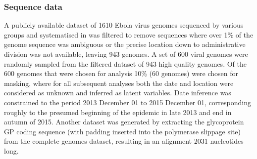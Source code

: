 \documentclass[11pt,oneside,letterpaper]{article}
\begin{document}
\subsubsection*{Sequence data}
A publicly available dataset of 1610 Ebola virus genomes sequenced by various groups \citep{baize_emergence_2014,gire_genomic_2014,park_ebola_2015,carroll_temporal_2015,kugelman_monitoring_2015,ladner_evolution_2015,simon-loriere_distinct_2015,tong_genetic_2015,arias_rapid_2016,smits_genotypic_2015,quick_rapid_2015} and systematised in \cite{dudas_virus_2017} was filtered to remove sequences where over 1\% of the genome sequence was ambiguous or the precise location down to administrative division was not available, leaving 943 genomes.
A set of 600 viral genomes were randomly sampled from the filtered dataset of 943 high quality genomes.
Of the 600 genomes that were chosen for analysis 10\% (60 genomes) were chosen for masking, where for all subsequent analyses both the date and location were considered as unknown and inferred as latent variables.
Date inference was constrained to the period 2013 December 01 to 2015 December 01, corresponding roughly to the presumed beginning of the epidemic in late 2013 and end in autumn of 2015.
Another dataset was generated by extracting the glycoprotein GP coding sequence (with padding inserted into the polymerase slippage site) from the complete genomes dataset, resulting in an alignment 2031 nucleotides long.
\end{document}

